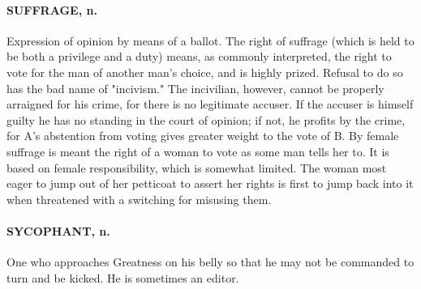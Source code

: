 \documentclass[11pt]{article}
\begin{document}
\paragraph{SUFFRAGE, n.}  Expression of opinion by means of a ballot.  The right
of suffrage (which is held to be both a privilege and a duty) means,
as commonly interpreted, the right to vote for the man of another
man's choice, and is highly prized.  Refusal to do so has the bad name
of "incivism."  The incivilian, however, cannot be properly arraigned
for his crime, for there is no legitimate accuser.  If the accuser is
himself guilty he has no standing in the court of opinion; if not, he
profits by the crime, for A's abstention from voting gives greater
weight to the vote of B.  By female suffrage is meant the right of a
woman to vote as some man tells her to.  It is based on female
responsibility, which is somewhat limited.  The woman most eager to
jump out of her petticoat to assert her rights is first to jump back
into it when threatened with a switching for misusing them.

\paragraph{SYCOPHANT, n.}  One who approaches Greatness on his belly so that he
may not be commanded to turn and be kicked.  He is sometimes an
editor.
\end{document}

